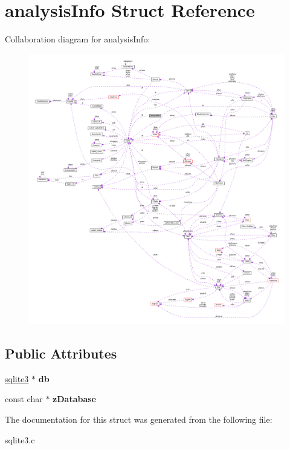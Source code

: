 \hypertarget{structanalysis_info}{\section{analysis\-Info Struct Reference}
\label{structanalysis_info}
}


Collaboration diagram for analysis\-Info\-:\nopagebreak
\begin{figure}[H]
\begin{center}
\leavevmode
\includegraphics[width=350pt]{structanalysis_info__coll__graph}
\end{center}
\end{figure}
\subsection*{Public Attributes}
\begin{DoxyCompactItemize}
\item 
\hypertarget{structanalysis_info_a13108eadc55ffe73a8825fb91cc0f9b5}{\hyperlink{structsqlite3}{sqlite3} $\ast$ {\bfseries db}}\label{structanalysis_info_a13108eadc55ffe73a8825fb91cc0f9b5}

\item 
\hypertarget{structanalysis_info_accbe3c1f5613ffa13b9578e58a5d850a}{const char $\ast$ {\bfseries z\-Database}}\label{structanalysis_info_accbe3c1f5613ffa13b9578e58a5d850a}

\end{DoxyCompactItemize}


The documentation for this struct was generated from the following file\-:\begin{DoxyCompactItemize}
\item 
sqlite3.\-c\end{DoxyCompactItemize}
